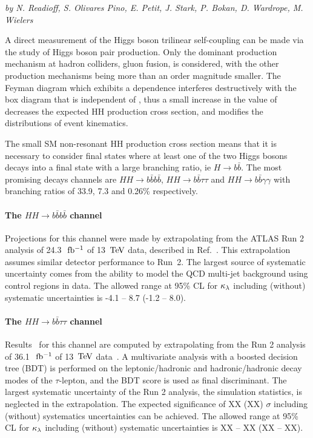 \begin{center}
\textit{by N. Readioff, S. Olivares Pino, E. Petit, J. Stark, P. Bokan, D. Wardrope, M. Wielers}
\end{center}

A direct measurement of the Higgs boson trilinear self-coupling \lHHH can be made via the study of Higgs boson pair production. Only the dominant production mechanism at hadron colliders, gluon fusion, is considered, with the other production mechanisms being more than an order magnitude smaller.
The Feyman diagram which exhibits a \lHHH dependence interferes destructively with the box diagram that is independent of \lHHH , thus a small increase in the value of \lHHH decreases the expected HH production cross section, and modifies the distributions of event kinematics.

The small SM non-resonant HH production cross section means that it is necessary to consider final states where at least one of the two Higgs bosons decays into a final state with a large branching ratio, ie $H \rightarrow b\bar{b}$. The most promising decays channels are $HH \rightarrow b\bar{b}b\bar{b}$, $HH \rightarrow b\bar{b}\tau\tau$ and $HH \rightarrow b\bar{b}\gamma\gamma$ with branching ratios of 33.9, 7.3 and 0.26\% respectively.

%
\paragraph{The $HH \rightarrow b\bar{b}b\bar{b}$ channel}

Projections for this channel were made by extrapolating from the ATLAS Run 2 analysis of 24.3 $\rm~fb^{-1}$ of 13~$\text{Te\kern -0.1em V}$ data, described in Ref.~\cite{ITKPixelTDR}. This extrapolation assumes similar detector performance to Run~2. The largest source of systematic uncertainty comes from the ability to model the QCD multi-jet background using control regions in data. The allowed range at 95\% CL for $\kappa_{\lambda}$ including (without) systematic uncertainties is -4.1 -- 8.7 (-1.2 -- 8.0).

%
\paragraph{The $HH \rightarrow b\bar{b}\tau\tau$ channel}

Results~\cite{ATLASHHPUBnote} for this channel are computed by extrapolating from the Run 2 analysis of 36.1 $\rm~fb^{-1}$ of 13~$\text{Te\kern -0.1em V}$ data~\cite{ATLASrun2HHbbtautau}. A multivariate analysis with a boosted decision tree (BDT) is performed on the leptonic/hadronic and hadronic/hadronic decay modes of the $\tau$-lepton, and the BDT score is used as final discriminant. The largest systematic uncertainty of the Run 2 analysis, the simulation statistics, is neglected in the extrapolation. The expected significance of XX (XX) $\sigma$ including (without) systematics uncertainties can be achieved. The allowed range at 95\% CL for $\kappa_{\lambda}$ including (without) systematic uncertainties is XX -- XX (XX -- XX).


